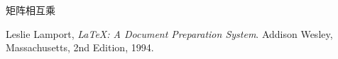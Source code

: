 \documentclass[fontsize=11pt, %
                             paper=a4, %
                             oneside, %
                             captions=tableheading,
                             index=totoc,
                             hyperref]{labbook}
\begin{document}
\begin{addmargin}[0cm]{0cm}






矩阵相互乘

\end{addmargin}


\begin{thebibliography}{9}

Leslie Lamport,
\emph{\LaTeX: A Document Preparation System}.
Addison Wesley, Massachusetts,
2nd Edition,
1994.

\end{thebibliography}

\end{document}
